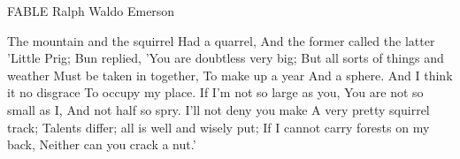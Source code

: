 FABLE
Ralph Waldo Emerson

The mountain and the squirrel
Had a quarrel,
And the former called the latter 'Little Prig;
Bun replied,
'You are doubtless very big;
But all sorts of things and weather
Must be taken in together,
To make up a year
And a sphere.
And I think it no disgrace
To occupy my place.
If I'm not so large as you,
You are not so small as I,
And not half so spry.
I'll not deny you make
A very pretty squirrel track;
Talents differ; all is well and wisely put;
If I cannot carry forests on my back,
Neither can you crack a nut.'
